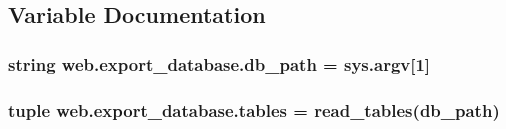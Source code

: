 \subsection{Variable Documentation}
\hypertarget{namespaceweb_1_1export__database_a42269ae99aba6b0b88e905698a468eba}{
\subsubsection[{db\-\_\-path}]{\setlength{\rightskip}{0pt plus 5cm}string web.\-export\-\_\-database.\-db\-\_\-path = sys.\-argv\mbox{[}1\mbox{]}}}\label{namespaceweb_1_1export__database_a42269ae99aba6b0b88e905698a468eba}
\hypertarget{namespaceweb_1_1export__database_a8dcaae1aee086bde0bfe50ab1f4e0885}{
\subsubsection[{tables}]{\setlength{\rightskip}{0pt plus 5cm}tuple web.\-export\-\_\-database.\-tables = {\bf read\-\_\-tables}({\bf db\-\_\-path})}}\label{namespaceweb_1_1export__database_a8dcaae1aee086bde0bfe50ab1f4e0885}
